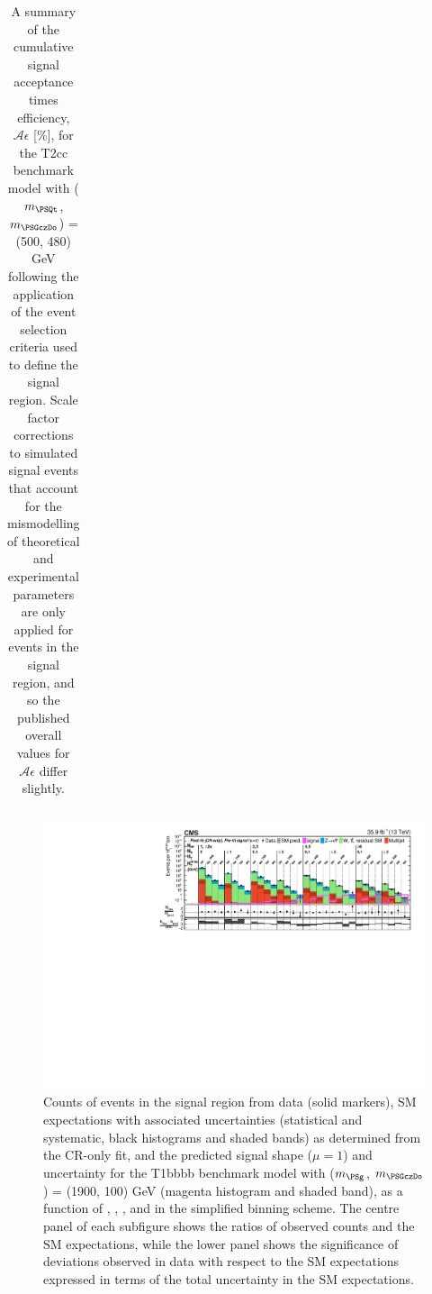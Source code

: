 \begin{table}[p]
\begin{center}
\begin{tabular}{lrr}
      \hline
        \end{tabular}
        \caption{A summary of the cumulative signal acceptance times
        efficiency, $\mathcal{A}\epsilon$ [\%], for the
        T2cc benchmark model with ($m_{\PSQt}$, $m_{\PSGczDo}$) = (500, 480) GeV
        following the application of
        the event selection criteria used to define the signal region.  Scale
        factor corrections to simulated signal events that account for the
        mismodelling of theoretical and experimental parameters are only
        applied for events in the signal region, and so the published overall
        values for $\mathcal{A}\epsilon$ differ slightly.
}
        \label{tab:T2cc_500_480_MR_sig}
    \end{center}
\end{table}

\begin{figure}[p]
    \begin{center}
        \includegraphics[width=1.00\textwidth]{Supplementary/CMS-SUS-16-038_Figure-aux_029.pdf}
  \caption{Counts of events in the signal region from data (solid markers), SM expectations
    with associated uncertainties (statistical and systematic, black
    histograms and shaded bands) as determined from the CR-only fit,
    and the predicted signal shape ($\mu=1$) and uncertainty for the
        T1bbbb benchmark model with ($m_{\PSg}$, $m_{\PSGczDo}$) = (1900, 100) GeV
        (magenta histogram and shaded band),
    as a function of \njet, \nb, \scalht, and \mht in the simplified binning scheme.
    The centre panel of each subfigure shows the ratios of
    observed counts and the SM expectations, while the lower panel
    shows the significance of deviations observed in data with respect
    to the SM expectations expressed in terms of the total uncertainty
    in the SM expectations.  }
        \label{fig:T1bbbb_1900_100_MR_sig}
    \end{center}
\end{figure}


